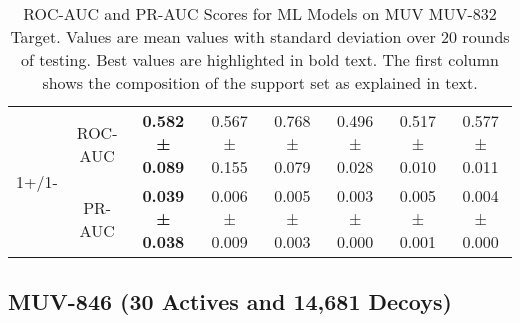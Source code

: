 \documentclass[journal=jcisd8,manuscript=article,final]{achemso}
\begin{document}
\begin{table}[h]
{\begin{tabular}{@{}cccccccc@{}}
				\midrule
				\multirow{ 2}{*}{1+/1-} & ROC-AUC & \textbf{0.582 ± 0.089} & 0.567 ± 0.155 & 0.768 ± 0.079 & 0.496 ± 0.028 & 0.517 ± 0.010 & 0.577 ± 0.011 \\ & PR-AUC & \textbf{0.039 ± 0.038} & 0.006 ± 0.009 & 0.005 ± 0.003 & 0.003 ± 0.000 & 0.005 ± 0.001 & 0.004 ± 0.000\\
				\bottomrule
			\end{tabular}
		}
		\caption[ROC-AUC and PR-AUC Scores for MUV MUV-832 Target.]{ROC-AUC and PR-AUC Scores for ML Models on MUV MUV-832 Target. Values are mean values with standard deviation over 20 rounds of testing. Best values are highlighted in bold text. The first column shows the composition of the support set as explained in text.}
		\label{table:MUV-MUV-832}
	\end{table}

	\clearpage
	\subsection{MUV-846 (30 Actives and 14,681 Decoys)}
	
\end{document}
